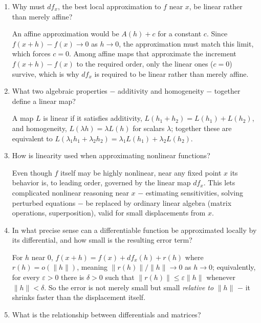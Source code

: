 \documentclass{self-check}
\begin{document}
\begin{enumerate}[resume, leftmargin=*, itemsep=8pt]
  \item Why must \(df_{x}\), the best local approximation to \(f\) near \(x\), be linear rather than merely affine?
    \begin{answer}
      An affine approximation would be \(A(h)+c\) for a constant \(c\). Since \(f(x+h)-f(x)\to0\) as \(h\to0\), the approximation must match this limit, which forces \(c=0\). Among affine maps that approximate the increment \(f(x+h)-f(x)\) to the required order, only the linear ones (\(c=0\)) survive, which is why \(df_{x}\) is required to be linear rather than merely affine.
    \end{answer}
  \item What two algebraic properties \(-\) additivity and homogeneity \(-\) together define a linear map?
    \begin{answer}
      A map \(L\) is linear if it satisfies additivity, \(L(h_{1}+h_{2})=L(h_{1})+L(h_{2})\), and homogeneity, \(L(\lambda h)=\lambda L(h)\) for scalars \(\lambda\); together these are equivalent to \(L(\lambda_{1}h_{1}+\lambda_{2}h_{2})=\lambda_{1}L(h_{1})+\lambda_{2}L(h_{2})\).
    \end{answer}
  \item How is linearity used when approximating nonlinear functions?
    \begin{answer}
      Even though \(f\) itself may be highly nonlinear, near any fixed point \(x\) its behavior is, to leading order, governed by the linear map \(df_{x}\). This lets complicated nonlinear reasoning near \(x\) \(-\) estimating sensitivities, solving perturbed equations \(-\) be replaced by ordinary linear algebra (matrix operations, superposition), valid for small displacements from \(x\).
    \end{answer}
  \item In what precise sense can a differentiable function be approximated locally by its differential, and how small is the resulting error term?
    \begin{answer}
      For \(h\) near \(0\), \(f(x+h)=f(x)+df_{x}(h)+r(h)\) where \(r(h)=o(\|h\|)\), meaning \(\|r(h)\|/\|h\|\to0\) as \(h\to0\); equivalently, for every \(\varepsilon>0\) there is \(\delta>0\) such that \(\|r(h)\|\le\varepsilon\|h\|\) whenever \(\|h\|<\delta\). So the error is not merely small but small \emph{relative to} \(\|h\|\) \(-\) it shrinks faster than the displacement itself.
    \end{answer}
  \item What is the relationship between differentials and matrices?

\end{enumerate}
\end{document}
